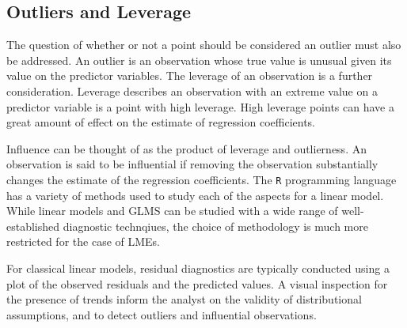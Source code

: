 \documentclass[12pt, a4paper]{article}
\begin{document}
			
			
			
			
			\subsection{Outliers and Leverage}
			
			
			
			The question of whether or not a point should be considered an outlier must also be addressed. An outlier is an observation whose true value is unusual given its value on the predictor variables. The leverage of an observation is a further consideration. Leverage describes an observation with an extreme value on a predictor variable is a point with high leverage. High leverage points can have a great amount of effect on the estimate of regression coefficients.
			
			Influence can be thought of as the product of leverage and outlierness. An observation is said to be influential if removing the observation substantially changes the estimate of the regression coefficients. The \texttt{R} programming language has a variety of methods used to study each of the aspects for a linear model. While linear models and GLMS can be studied with a wide range of well-established diagnostic technqiues, the choice of methodology is much more restricted for the case of LMEs.
			
			For classical linear models, residual diagnostics are typically conducted using a plot of the observed residuals and the predicted values. A visual inspection for the presence of trends inform the analyst on the validity of distributional assumptions, and to detect outliers and influential observations.
			
\end{document}
